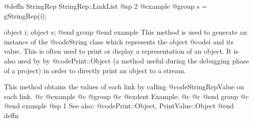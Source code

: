 @deffn {StringRep} StringRep::LinkList
@sp 2
@example
@group
s = gStringRep(i);

object  i;
object  s;
@end group
@end example
This method is used to generate an instance of the @code{String} class
which represents the object @code{i} and its value.  This is often used
to print or display a representation of an object.  It is also used by
by @code{Print::Object} (a method useful during the debugging phase of
a project) in order to directly print an object to a stream.


This method obtains the values of each link by calling @code{StringRepValue}
on each link.
@c @example
@c @group
@c @exdent Example:
@c 
@c @end group
@c @end example
@sp 1
See also:  @code{Print::Object, PrintValue::Object}
@end deffn











